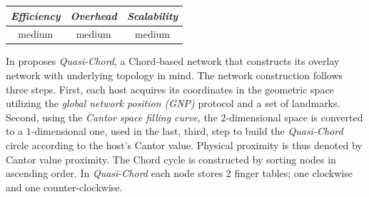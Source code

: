 \begin{center}
\begin{tabular}{ccc}
\emph{Efficiency} & \emph{Overhead} & \emph{Scalability} \\
\hline
%
medium &
%
medium &
%
medium
\end{tabular}
\end{center}

In \cite{SZ2008} proposes \emph{Quasi-Chord}, a Chord-based network that
constructs its overlay network with underlying topology in mind. The network
construction follows three steps. First, each host acquires its coordinates in
the geometric space utilizing the \emph{global network position (GNP)} protocol
\cite{ng_gnp_2001} and a set of landmarks.
Second, using the \emph{Cantor space filling curve}, the $2$-dimensional space
is converted to a $1$-dimensional one, used in the last, third, step to build
the \emph{Quasi-Chord} circle according to the host's Cantor value. Physical
proximity is thus denoted by Cantor value proximity. The Chord cycle is
constructed by sorting nodes in ascending order. In \emph{Quasi-Chord}
each node stores 2 finger tables; one clockwise and one counter-clockwise.

